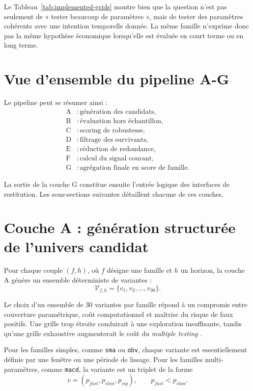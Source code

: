 Le Tableau~\ref{tab:implemented-grids} montre bien que la question n'est pas
seulement de « tester beaucoup de paramètres », mais de tester des paramètres
cohérents avec une intention temporelle donnée. La même famille n'exprime donc
pas la même hypothèse économique lorsqu'elle est évaluée en court terme ou en
long terme.

\section{Vue d'ensemble du pipeline A-G}
Le pipeline peut se résumer ainsi :
\begin{align*}
\text{A} &: \text{génération des candidats},\\
\text{B} &: \text{évaluation hors échantillon},\\
\text{C} &: \text{scoring de robustesse},\\
\text{D} &: \text{filtrage des survivants},\\
\text{E} &: \text{réduction de redondance},\\
\text{F} &: \text{calcul du signal courant},\\
\text{G} &: \text{agrégation finale en score de famille}.
\end{align*}

La sortie de la couche G constitue ensuite l'entrée logique des interfaces de
restitution. Les sous-sections suivantes détaillent chacune de ces couches.

\section{Couche A : génération structurée de l'univers candidat}
Pour chaque couple \((f,h)\), où \(f\) désigne une famille et \(h\) un horizon,
la couche A génère un ensemble déterministe de variantes :
\[
\mathcal{V}_{f,h} = \{v_1, v_2, \dots, v_{30}\}.
\]

Le choix d'un ensemble de 30 variantes par famille répond à un compromis entre
couverture paramétrique, coût computationnel et maîtrise du risque de faux
positifs. Une grille trop étroite conduirait à une exploration insuffisante,
tandis qu'une grille exhaustive augmenterait le coût du \emph{multiple testing}
\cite{harvey2016}.

Pour les familles simples, comme \texttt{sma} ou \texttt{obv}, chaque variante
est essentiellement définie par une fenêtre ou une période de lissage. Pour les
familles multi-paramètres, comme \texttt{macd}, la variante est un triplet de la
forme
\[
v = (p_{fast},p_{slow},p_{sig}), \qquad p_{fast}<p_{slow}.
\]

